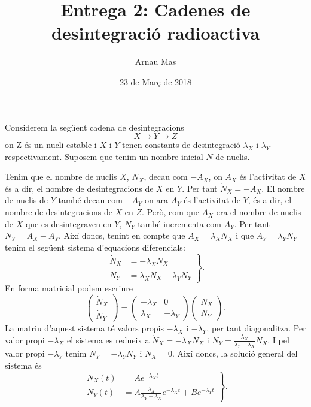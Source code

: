 \documentclass[12pt]{article}
\title{\textsf{\textbf{Entrega 2}: Cadenes de desintegració radioactiva}}
\author{\textsf{Arnau Mas}}
\date{\textsf{23 de Març de 2018}}
\begin{document}
\maketitle
Considerem la següent cadena de desintegracions
\begin{equation*}
	X \to Y \to Z
\end{equation*}
on Z és un nucli estable i \( X \) i \( Y \) tenen constants de desintegració \( \lambda_X \) i \( \lambda_Y \) respectivament. Suposem que tenim un nombre inicial \( N \) de nuclis.

Tenim que el nombre de nuclis \( X \), \( N_X \), decau com \( -A_X \), on \( A_X \) és l'activitat de \( X \) és a dir, el nombre de desintegracions de \( X \) en \( Y \). Per tant \( \dot{N}_X = -A_X \). El nombre de nuclis de \( Y \)   també decau com \( -A_Y \) on ara \( A_Y \) és l'activitat de \( Y \), és a dir, el nombre de desintegracions de \( X \) en \( Z \). Però, com que \( A_X \) era el nombre de nuclis de \( X \) que es desintegraven en \( Y \), \( N_Y \) també incrementa com \( A_Y \). Per tant \( \dot{N}_Y = A_X - A_Y \). Així doncs, tenint en compte que \( A_X = \lambda_X N_X \) i que \( A_Y = \lambda_Y N_Y \) tenim el següent sistema d'equacions diferencials:
\begin{equation} \label{eq:eqs diferencials}
	\left.
		\begin{aligned}
			\dot{N}_X &= -\lambda_X N_X \\
			\dot{N}_Y & = \lambda_X N_X - \lambda_Y N_Y
		\end{aligned}	
	\right\}.
\end{equation}
En forma matricial podem escriure
\begin{equation} \label{eq:eqs diferencials matriu}
	\begin{pmatrix}
		\dot{N}_X \\
		\dot{N}_Y 
	\end{pmatrix}
	=
	\begin{pmatrix}
		- \lambda_X & 0 \\
		\lambda_X & -\lambda_Y 
	\end{pmatrix}
	\begin{pmatrix}
		N_X \\
		N_Y
	\end{pmatrix}.
\end{equation}
La matriu d'aquest sistema té valors propis \( -\lambda_X \) i \( -\lambda_Y \), per tant diagonalitza. Per valor propi \( -\lambda_X \) el sistema es redueix a \( \dot{N}_X = -\lambda_X N_X \) i \( N_Y = \frac{\lambda_X}{\lambda_Y - \lambda_X} N_X \). I pel valor propi \( -\lambda_Y \) tenim \( \dot{N}_Y = -\lambda_Y N_Y \) i \( N_X = 0 \). Així doncs, la solució general del sistema és 
\begin{equation} \label{eq:sol general}
\left.
	\begin{aligned}
		N_X(t) & = Ae^{-\lambda_X t} \\
		N_Y(t) & = A\frac{\lambda_X}{\lambda_Y - \lambda_X}e^{-\lambda_X t} + Be^{-\lambda_Y t}
	\end{aligned}
\right\}.
\end{equation}
\end{document}
